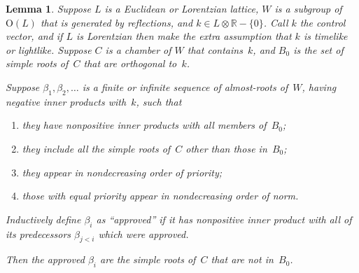 \documentclass[12pt]{amsart}
\def\R{\mathbb{R}}
\def\O{\mathrm{O}}
\def\tensor{\otimes}
\numberwithin{theorem}{section}
\numberwithin{equation}{section}
\numberwithin{figure}{section}
\newtheorem{lemma}[theorem]{Lemma}
\theoremstyle{remark}
\begin{document}
\begin{lemma}
    \label{LemVariation}
    Suppose $L$ is a Euclidean or Lorentzian lattice, $W$ is a subgroup of $\O(L)$
    that is generated by reflections, and
    $k\in L\tensor\R-\{0\}$.
    Call $k$ the control vector, and 
if $L$ is Lorentzian then
    make the extra assumption
    that 
    $k$ is timelike or lightlike.
    Suppose $C$ is a chamber of $W$ that contains~$k$, and
    $B_0$ is the set of simple roots of~$C$ that are orthogonal
    to~$k$.

    Suppose $\beta_1,\beta_2,\dots$ is a finite or infinite sequence of almost-roots
    of~$W$,
    having negative inner products with~$k$, such that
    \begin{enumerate}
        \item
            \label{LemVariationNonpositiveIPs}
            they have nonpositive inner products with all members of~$B_0$;
        \item
            \label{LemVariationAllSimpleRoots}
            they include all the simple roots of~$C$ other than those in~$B_0$;
        \item
            \label{LemVariationPriorityOrder}
            they appear in nondecreasing order
            of priority;
        \item
            \label{LemVariationNormOrder}
            those with equal priority appear in nondecreasing order of norm.
    \end{enumerate}
    Inductively define
     $\beta_i$ as ``approved'' if it has nonpositive inner product with all of its
    predecessors $\beta_{j<i}$ which were approved.  

    Then the approved $\beta_i$ are the
    simple roots of~$C$ that are not in~$B_0$.
\end{lemma}
\end{document}
